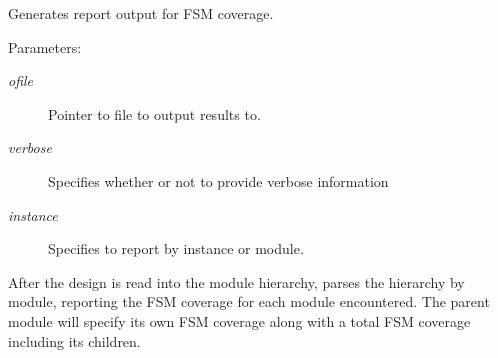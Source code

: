 Generates report output for FSM coverage.

\begin{Desc}
\item[Parameters: ]\par
\begin{description}
\item[{\em 
ofile}]Pointer to file to output results to. \item[{\em 
verbose}]Specifies whether or not to provide verbose information \item[{\em 
instance}]Specifies to report by instance or module.\end{description}
\end{Desc}
After the design is read into the module hierarchy, parses the hierarchy by module, reporting the FSM coverage for each module encountered. The parent module will specify its own FSM coverage along with a total FSM coverage including its  children. 